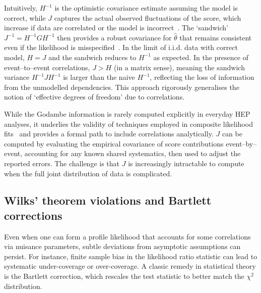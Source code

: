             Intuitively, $H^{-1}$ is the optimistic covariance estimate assuming the model is correct, while $J$ captures the actual observed fluctuations of the score, which increase if data are correlated or the model is incorrect~\cite{Geyer20135601Estimator, Geyer2020StatEquations}.
            The `sandwich' $ J^{-1} = H^{-1} G H^{-1}$ then provides a robust covariance for $\hat{\theta}$ that remains consistent even if the likelihood is misspecified~\cite{eicker_limit_1967, huber_behavior_1967, white_heteroskedasticity-consistent_1980}.
            In the limit of i.i.d. data with correct model, $H=J$ and the sandwich reduces to $H^{-1}$ as expected.
            In the presence of event--to--event correlations, $J > H$ (in a matrix sense), meaning the sandwich variance $H^{-1}JH^{-1}$ is larger than the naive $H^{-1}$, reflecting the loss of information from the unmodelled dependencies.
            This approach rigorously generalises the notion of `effective degrees of freedom' due to correlations.
            
            While the Godambe information is rarely computed explicitly in everyday HEP analyses, it underlies the validity of techniques employed in composite likelihood fits~\cite{ZhouInformationSelection, Huang2022FastLikelihoods} and provides a formal path to include correlations analytically.
            $J$ can be computed by evaluating the empirical covariance of score contributions event--by--event, accounting for any known shared systematics, then used to adjust the reported errors.
            The challenge is that $J$ is increasingly intractable to compute when the full joint distribution of data is complicated.

        \subsection{Wilks’ theorem violations and Bartlett corrections}
            \label{subsec:bartlett-corrections}
            Even when one can form a profile likelihood that accounts for some correlations via nuisance parameters, subtle deviations from asymptotic assumptions can persist.
            For instance, finite sample bias in the likelihood ratio statistic can lead to systematic under-coverage or over-coverage.
            A classic remedy in statistical theory is the Bartlett correction, which rescales the test statistic to better match the $\chi^2$ distribution.
            
